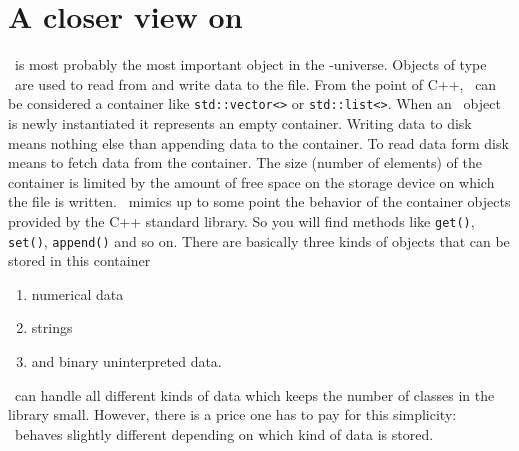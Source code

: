 \section{A closer view on \nxfield}\label{section:nxfield_design}
\nxfield\ is most probably the most important object in the \pninx-universe. 
Objects of type \nxfield\ are used to read from and write data to the file. 
From the point of C++, \nxfield\ can be considered a container like 
{\tt std::vector<>} or {\tt std::list<>}.
When an \nxfield\ object is newly instantiated it represents an empty container. 
Writing data to disk means nothing else than appending data to the container. 
To read data form disk means to fetch data from the container.
The size (number of elements) of the container is limited by the amount of 
free space on the storage device on which the file is written.
\nxfield\ mimics up to some point the behavior of the container objects
provided by the C++ standard library. So you will find methods like 
{\tt get()}, {\tt set()}, {\tt append()} and so on. 
There are basically three kinds of objects that can be stored in this container
\begin{enumerate}
  \item numerical data
  \item strings
  \item and binary uninterpreted data.
\end{enumerate}
\nxfield\ can handle all different kinds of data which keeps the number of 
classes in the library small. However, there is a price one has to pay 
for this simplicity: \nxfield\ behaves slightly different depending 
on which kind of data is stored. 

